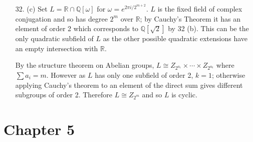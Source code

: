 \documentclass{article}
\newcommand{\w}[0]{\omega}
\newcommand{\Q}[0]{\mathbb{Q}}
\newcommand{\R}[0]{\mathbb{R}}
\begin{document}
\begin{enumerate}
\item[32. (c)] Set $L = \R \cap \Q[\w]$ for $\w = e^{2\pi i/2^{m+2}}$.  $L$ is the fixed field of complex conjugation and so has degree $2^{m}$ over $\R$; by Cauchy's Theorem it has an element of order 2 which corresponds to $\Q[\sqrt{2}]$ by 32 (b).  This can be the only quadratic subfield of $L$ as the other possible quadratic extensions have an empty intersection with $\R$.

By the structure theorem on Abelian groups, $L \cong Z_{2^{a_1}} \times \cdots \times Z_{2^{a_k}}$ where $\sum a_i = m$.  However as $L$ has only one subfield of order 2,  $k = 1$; otherwise applying Cauchy's theorem to an element of the direct sum gives different subgroups of order 2.  Therefore $L \cong Z_{2^m}$ and so $L$ is cyclic.

\end{enumerate}

\section*{Chapter 5}
\end{document}
